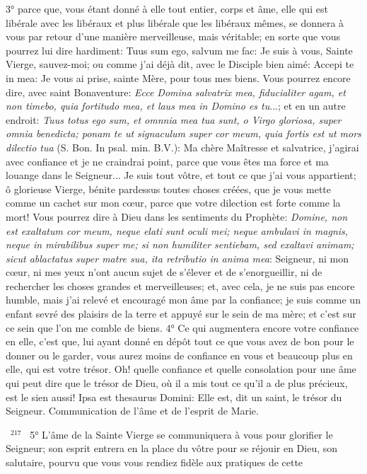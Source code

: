 \documentclass[paper=a5,pagesize=pdftex,fontsize=15pt,headinclude=on,twoside=off]{scrbook}
\newcommand{\negphantom}[1]{\settowidth{\dimen0}{#1}\hspace*{-\dimen0}}
\newcommand{\versenb}[1]{\par \vspace{10pt}~\negphantom{~${}^{#1}$~}${}^{#1}$~}
\newcommand{\latin}[1]{\emph{#1}}
\begin{document}
3° parce que, vous étant donné à elle tout entier, corps et âme, elle qui est libérale avec les libéraux et plus libérale que les libéraux mêmes, se donnera à vous par retour d'une manière merveilleuse, mais véritable; en sorte que vous pourrez lui dire hardiment: Tuus sum ego, salvum me fac: Je suis à vous, Sainte Vierge, sauvez-moi; ou comme j'ai déjà dit, avec le Disciple bien aimé: Accepi te in mea: Je vous ai prise, sainte Mère, pour tous mes biens. Vous pourrez encore dire, avec saint Bonaventure: \latin{Ecce Domina salvatrix mea, fiducialiter agam, et non timebo, quia fortitudo mea, et laus mea in Domino es tu}...; et en un autre endroit: \latin{Tuus totus ego sum, et omnnia mea tua sunt, o Virgo gloriosa, super omnia benedicta; ponam te ut signaculum super cor meum, quia fortis est ut mors dilectio tua} (S. Bon. In psal. min. B.V.): Ma chère Maîtresse et salvatrice, j'agirai avec confiance et je ne craindrai point, parce que vous êtes ma force et ma louange dans le Seigneur... Je suis tout vôtre, et tout ce que j'ai vous appartient; ô glorieuse Vierge, bénite pardessus toutes choses créées, que je vous mette comme un cachet sur mon cœur, parce que votre dilection est forte comme la mort! Vous pourrez dire à Dieu dans les sentiments du Prophète: \latin{Domine, non est exaltatum cor meum, neque elati sunt oculi mei; neque ambulavi in magnis, neque in mirabilibus super me; si non humiliter sentiebam, sed exaltavi animam; sicut ablactatus super matre sua, ita retributio in anima mea}: Seigneur, ni mon cœur, ni mes yeux n'ont aucun sujet de s'élever et de s'enorgueillir, ni de rechercher les choses grandes et merveilleuses; et, avec cela, je ne suis pas encore humble, mais j'ai relevé et
encouragé mon âme par la confiance; je suis comme un enfant sevré des plaisirs de la terre et appuyé sur le sein
de ma mère; et c'est sur ce sein que l'on me comble de biens. 4° Ce qui augmentera encore votre confiance en
elle, c'est que, lui ayant donné en dépôt tout ce que vous avez de bon pour le donner ou le garder, vous aurez
moins de confiance en vous et beaucoup plus en elle, qui est votre trésor. Oh! quelle confiance et quelle
consolation pour une âme qui peut dire que le trésor de Dieu, où il a mis tout ce qu'il a de plus précieux, est le sien
aussi! Ipsa est thesaurus Domini: Elle est, dit un saint, le trésor du Seigneur.
Communication de l'âme et de l'esprit de Marie.
\versenb{217} 5° L'âme de la Sainte Vierge se communiquera à vous pour glorifier le Seigneur; son esprit entrera en la
place du vôtre pour se réjouir en Dieu, son salutaire, pourvu que vous vous rendiez fidèle aux pratiques de cette
\end{document}
